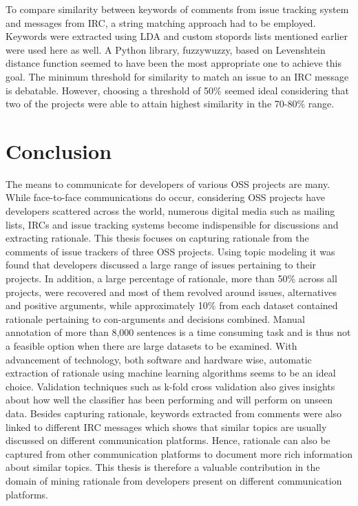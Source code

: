 \documentclass[a4paper,12pt,twoside]{report}
\begin{document}
\newline \newline
To compare similarity between keywords of comments from issue tracking system and messages from \acs{IRC}, a string matching approach had to be employed. Keywords were extracted using \acs{LDA} and custom stopords lists mentioned earlier were used here as well. A Python library, fuzzywuzzy, based on Levenshtein distance function seemed to have been the most appropriate one to achieve this goal. The minimum threshold for similarity to match an issue to an \acs{IRC} message is debatable. However, choosing a threshold of 50\% seemed ideal considering that two of the projects were able to attain highest similarity in the 70-80\% range. 

\section{Conclusion}
The means to communicate for developers of various \acs{OSS} projects are many. While face-to-face communications do occur, considering \acs{OSS} projects have developers scattered across the world, numerous digital media such as mailing lists, \acs{IRC}s and issue tracking systems become indispensible for discussions and extracting rationale. This thesis focuses on capturing rationale from the comments of issue trackers of three \acs{OSS} projects. Using topic modeling it was found that developers discussed a large range of issues pertaining to their projects. In addition, a large percentage of rationale, more than 50\% across all projects, were recovered and most of them revolved around issues, alternatives and positive arguments, while approximately 10\% from each dataset contained rationale pertaining to con-arguments and decisions combined.
\newline \newline
Manual annotation of more than 8,000 sentences is a time consuming task and is thus not a feasible option when there are large datasets to be examined. With advancement of technology, both software and hardware wise, automatic extraction of rationale using machine learning algorithms seems to be an ideal choice. Validation techniques such as k-fold cross validation also gives insights about how well the classifier has been performing and will perform on unseen data. 
\newline \newline
Besides capturing rationale, keywords extracted from comments were also linked to different \acs{IRC} messages which shows that similar topics are usually discussed on different communication platforms. Hence, rationale can also be captured from other communication platforms to document more rich information about similar topics. This thesis is therefore a valuable contribution in the domain of mining rationale from developers present on different communication platforms. 
\end{document}
